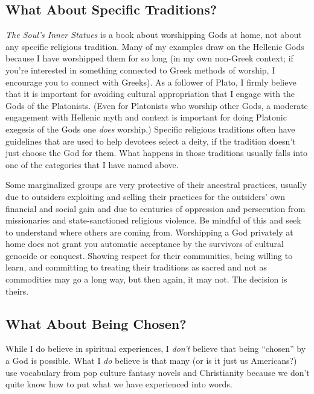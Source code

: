 \documentclass[
]{book}
\begin{document}
\hypertarget{what-about-specific-traditions}{%
\subsection{What About Specific Traditions?}\label{what-about-specific-traditions}}

\emph{The Soul's Inner Statues} is a book about worshipping Gods at home, not about any specific religious tradition. Many of my examples draw on the Hellenic Gods because I have worshipped them for so long (in my own non-Greek context; if you're interested in something connected to Greek methods of worship, I encourage you to connect with Greeks). As a follower of Plato, I firmly believe that it is important for avoiding cultural appropriation that I engage with the Gods of the Platonists. (Even for Platonists who worship other Gods, a moderate engagement with Hellenic myth and context is important for doing Platonic exegesis of the Gods one \emph{does} worship.) Specific religious traditions often have guidelines that are used to help devotees select a deity, if the tradition doesn't just choose the God for them. What happens in those traditions usually falls into one of the categories that I have named above.

Some marginalized groups are very protective of their ancestral practices, usually due to outsiders exploiting and selling their practices for the outsiders' own financial and social gain and due to centuries of oppression and persecution from missionaries and state-sanctioned religious violence. Be mindful of this and seek to understand where others are coming from. Worshipping a God privately at home does not grant you automatic acceptance by the survivors of cultural genocide or conquest. Showing respect for their communities, being willing to learn, and committing to treating their traditions as sacred and not as commodities may go a long way, but then again, it may not. The decision is theirs.

\hypertarget{what-about-being-chosen}{%
\subsection{What About Being Chosen?}\label{what-about-being-chosen}}

While I do believe in spiritual experiences, I \emph{don't} believe that being ``chosen'' by a God is possible. What I \emph{do} believe is that many (or is it just us Americans?) use vocabulary from pop culture fantasy novels and Christianity because we don't quite know how to put what we have experienced into words.
\end{document}
